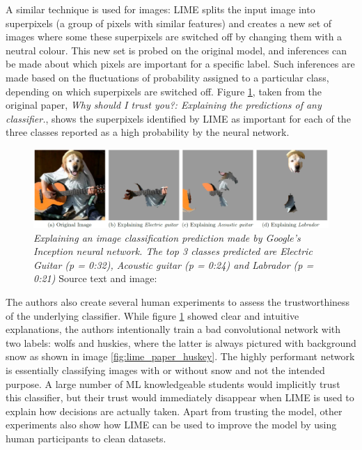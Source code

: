 \documentclass[proposal]{softeng}
\begin{document}
A similar technique is used for images: LIME splits the input image into superpixels (a group of pixels with similar features) and creates a new set of images where some these superpixels are switched off by changing them with a neutral colour. This new set is probed on the original model, and inferences can be made about which pixels are important for a specific label. Such inferences are made based on the fluctuations of probability assigned to a particular class, depending on which superpixels are switched off. Figure \ref{fig:lime_paper_dog}, taken from the original paper, \textit{Why should I trust you?: Explaining the predictions of any classifier.}, shows the superpixels identified by LIME as important for each of the three classes reported as a high probability by the neural network.

\begin{figure}[h!]
\centering

\includegraphics[width=.8\textwidth]{images/lime_paper_dog.png}

\caption{\textit{Explaining an image classification prediction made by Google's Inception neural network. The top
3 classes predicted are Electric Guitar (p = 0:32), Acoustic guitar (p = 0:24) and Labrador (p = 0:21)} Source text and image: \cite{RibeiroMarcoTulio2016WSIT}}

\label{fig:lime_paper_dog}
\end{figure}

The authors also create several human experiments to assess the trustworthiness of the underlying classifier. While figure \ref{fig:lime_paper_dog} showed clear and intuitive explanations, the authors intentionally train a bad convolutional network with two labels: wolfs and huskies, where the latter is always pictured with background snow as shown in image \ref{fig:lime_paper_huskey}. The highly performant network is essentially classifying images with or without snow and not the intended purpose. A large number of ML knowledgeable students would implicitly trust this classifier, but their trust would immediately disappear when LIME is used to explain how decisions are actually taken. Apart from trusting the model, other experiments also show how LIME can be used to improve the model by using human participants to clean datasets.
\end{document}
